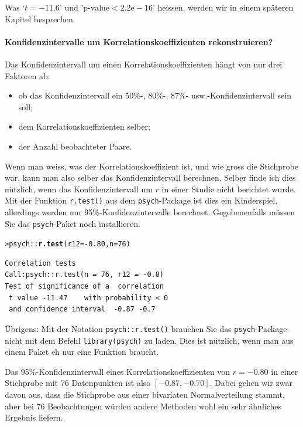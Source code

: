 \documentclass[oneside, 10pt]{book}\usepackage[]{graphicx}\usepackage[]{xcolor}
\makeatletter
\newcommand{\hlnum}[1]{\textcolor[rgb]{0.686,0.059,0.569}{#1}}%
\newcommand{\hlopt}[1]{\textcolor[rgb]{0,0,0}{#1}}%
\newcommand{\hlstd}[1]{\textcolor[rgb]{0.345,0.345,0.345}{#1}}%
\newcommand{\hlkwc}[1]{\textcolor[rgb]{0.333,0.667,0.333}{#1}}%
\newcommand{\hlkwd}[1]{\textcolor[rgb]{0.737,0.353,0.396}{\textbf{#1}}}%
\newenvironment{kframe}{%
 \def\at@end@of@kframe{}%
 \ifinner\ifhmode%
  \def\at@end@of@kframe{\end{minipage}}%
  \begin{minipage}{\columnwidth}%
 \fi\fi%
 \def\FrameCommand##1{\hskip\@totalleftmargin \hskip-\fboxsep
 \colorbox{shadecolor}{##1}\hskip-\fboxsep
     \hskip-\linewidth \hskip-\@totalleftmargin \hskip\columnwidth}%
 \MakeFramed {\advance\hsize-\width
   \@totalleftmargin\z@ \linewidth\hsize
   \@setminipage}}%
 {\par\unskip\endMakeFramed%
 \at@end@of@kframe}
\newenvironment{knitrout}{}{} %
\makeatother
\begin{document}
Was `$t = -11.6$' und '$\textrm{p-value} < 2.2\textrm{e}-16$' heissen,
werden wir in einem späteren Kapitel besprechen.

\paragraph{Konfidenzintervalle um Korrelationskoeffizienten rekonstruieren?}
Das Konfidenzintervall um einen Korrelationskoeffizienten
hängt von nur drei Faktoren ab:
\begin{itemize}
 \item ob das Konfidenzintervall ein 50\%-, 80\%-, 87\%- usw.-Konfidenzintervall sein soll;
 \item dem Korrelationskoeffizienten selber;
 \item der Anzahl beobachteter Paare.
\end{itemize}
Wenn man weiss, was der Korrelationskoeffizient ist, und wie gross die Stichprobe
war, kann man also selber das Konfidenzintervall berechnen.
Selber finde ich dies nützlich, wenn das Konfidenzintervall um $r$ in
einer Studie nicht berichtet wurde. Mit der Funktion \texttt{r.test()}
aus dem \texttt{psych}-Package ist dies ein Kinderspiel, allerdings
werden nur 95\%-Konfidenzintervalle berechnet.
Gegebenenfalls müssen Sie das \texttt{psych}-Paket noch installieren.
\begin{knitrout}
\color{fgcolor}\begin{kframe}
\begin{alltt}
\hlstd{> }\hlstd{psych}\hlopt{::}\hlkwd{r.test}\hlstd{(}\hlkwc{r12} \hlstd{=} \hlopt{-}\hlnum{0.80}\hlstd{,} \hlkwc{n} \hlstd{=} \hlnum{76}\hlstd{)}
\end{alltt}
\begin{verbatim}
Correlation tests 
Call:psych::r.test(n = 76, r12 = -0.8)
Test of significance of a  correlation 
 t value -11.47    with probability < 0
 and confidence interval  -0.87 -0.7
\end{verbatim}
\end{kframe}
\end{knitrout}
Übrigens: Mit der Notation \texttt{psych::r.test()} brauchen Sie das
\texttt{psych}-Package nicht mit dem Befehl \texttt{library(psych)} zu laden.
Dies ist nützlich, wenn man aus einem Paket eh nur eine Funktion
braucht.

Das 95\%-Konfidenzintervall eines Korrelationskoeffizienten
von $r = -0.80$ in einer Stichprobe mit 76 Datenpunkten ist also
$[-0.87, -0.70]$. Dabei gehen wir zwar davon aus, dass die Stichprobe
aus einer bivariaten Normalverteilung stammt, aber bei 76 Beobachtungen
würden andere Methoden wohl ein sehr ähnliches Ergebnis liefern.
\end{document}
